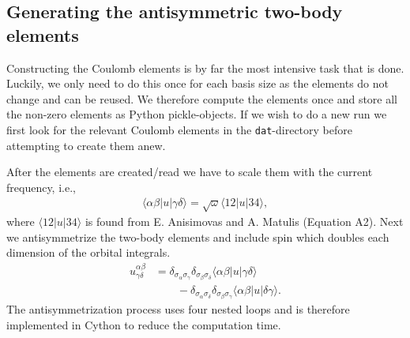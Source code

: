 \documentclass[
    a4paper, aps, twocolumn, floatfix, superscriptaddress,
    nofootinbib]{revtex4-1}
\newcommand{\1}{\mathds{1}}
\newcommand{\bra}[1]{\langle #1\lvert}
\newcommand{\ket}[1]{\rvert #1\rangle}
\begin{document}
    \subsection{Generating the antisymmetric two-body elements}
        Constructing the Coulomb elements is by far the most intensive task
        that is done. Luckily, we only need to do this once for each basis size
        as the elements do not change and can be reused. We therefore compute
        the elements once and store all the non-zero elements as Python
        pickle-objects. If we wish to do a new run we first look for the
        relevant Coulomb elements in the \texttt{dat}-directory before
        attempting to create them anew.

        After the elements are created/read we have to scale them with the
        current frequency, i.e.,
        \begin{align}
            \bra{\alpha\beta}u\ket{\gamma\delta}
            = \sqrt{\omega}\bra{12}u\ket{34},
        \end{align}
        where $\bra{12}u\ket{34}$ is found from E. Anisimovas and A.  Matulis
        (Equation A2)\cite{anisimovas1998energy}. Next we antisymmetrize the
        two-body elements and include spin which doubles each dimension of the
        orbital integrals.
        \begin{align}
            u^{\alpha\beta}_{\gamma\delta}
            &=
            \delta_{\sigma_{\alpha}\sigma_{\gamma}}
            \delta_{\sigma_{\beta}\sigma_{\delta}}
            \bra{\alpha\beta}u\ket{\gamma\delta}
            \nonumber \\
            &\qquad
            -
            \delta_{\sigma_{\alpha}\sigma_{\delta}}
            \delta_{\sigma_{\beta}\sigma_{\gamma}}
            \bra{\alpha\beta}u\ket{\delta\gamma}.
        \end{align}
        The antisymmetrization process uses four nested loops and is therefore
        implemented in Cython to reduce the computation time.
\end{document}
